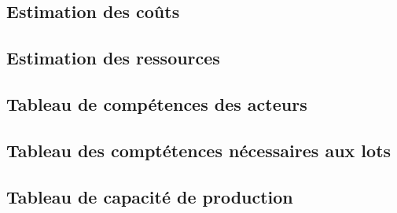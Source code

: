 \subsection{Estimation des coûts}
\subsection{Estimation des ressources}
\subsection{Tableau de compétences des acteurs}
\subsection{Tableau des comptétences nécessaires aux lots}
\subsection{Tableau de capacité de production}
